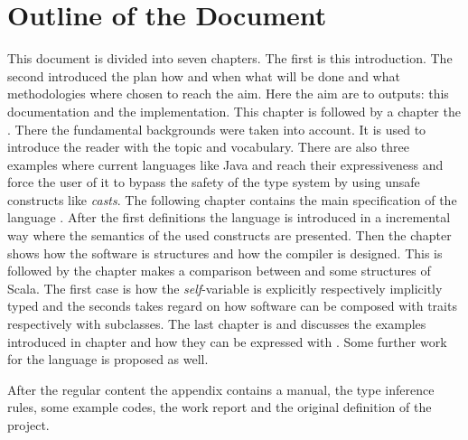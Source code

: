 \section{Outline of the Document}
This document is divided into seven chapters. The first is this introduction. The second
\emph{} introduced the plan how and
when what will be done and what methodologies where chosen to reach
the aim. Here the aim are to outputs: this documentation and
the implementation. This chapter is followed by a chapter the
\emph{}. There the fundamental
backgrounds were taken into account. It is used to introduce the
reader with the topic and vocabulary. There are also three examples
where current languages like Java and \cs reach their expressiveness
and force the user of it to bypass the safety of the type system
by using unsafe constructs like \emph{casts}. The following
chapter \emph{} contains
the main specification of the language \ooplss. After the first
definitions the language is introduced in a incremental way where
the semantics of the used constructs are presented. Then the chapter
\emph{} shows how the software is
structures and how the compiler is designed. This is followed by the
chapter \emph{} makes a comparison between
\ooplss and some structures of Scala. The first case is how the
\emph{self}-variable is explicitly respectively implicitly typed and
the seconds takes regard on how software can be composed with traits
respectively with subclasses. The last chapter is
\emph{} and discusses the examples
introduced in chapter \emph{} and how
they can be expressed with \ooplss. Some further work for the language
is proposed as well.

After the regular content the appendix contains a manual, the type
inference rules, some example codes, the work report and the original
definition of the project.

